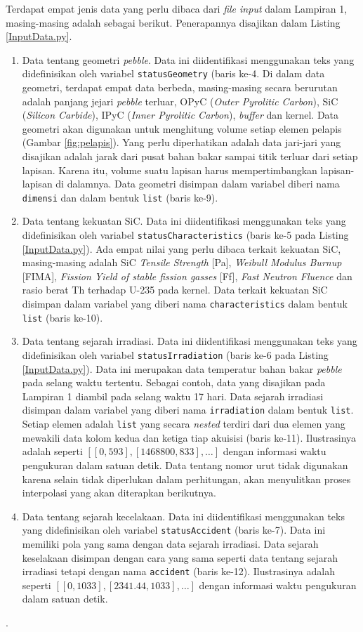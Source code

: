 \documentclass[a4paper,11pt]{report}
\begin{document}
Terdapat empat jenis data yang perlu dibaca dari \textit{file input} dalam Lampiran 1, masing-masing adalah sebagai berikut. Penerapannya disajikan dalam Listing \ref{InputData.py}.
\begin{enumerate}
  \item Data tentang geometri \textit{pebble}. Data ini diidentifikasi menggunakan teks yang didefinisikan oleh variabel \texttt{statusGeometry} (baris ke-4. Di dalam data geometri, terdapat empat data berbeda, masing-masing secara berurutan adalah panjang jejari \textit{pebble} terluar, OPyC (\textit{Outer Pyrolitic Carbon}), SiC (\textit{Silicon Carbide}), IPyC (\textit{Inner Pyrolitic Carbon}), \textit{buffer} dan kernel. Data geometri akan digunakan untuk menghitung volume setiap elemen pelapis (Gambar \ref{fig:pelapis}). Yang perlu diperhatikan adalah data jari-jari yang disajikan adalah jarak dari pusat bahan bakar sampai titik terluar dari setiap lapisan. Karena itu, volume suatu lapisan harus mempertimbangkan lapisan-lapisan di dalamnya. Data geometri disimpan dalam variabel diberi nama \texttt{dimensi} dan dalam bentuk \texttt{list} (baris ke-9).
  \item Data tentang kekuatan SiC. Data ini diidentifikasi menggunakan teks yang didefinisikan oleh variabel \texttt{statusCharacteristics} (baris ke-5 pada Listing \ref{InputData.py}). Ada empat nilai yang perlu dibaca terkait kekuatan SiC, masing-masing adalah SiC \textit{Tensile Strength} [Pa],	\textit{Weibull Modulus	Burnup} [FIMA],	\textit{Fission Yield of stable fission gasses} [Ff],	\textit{Fast Neutron Fluence}	dan rasio berat Th terhadap U-235 pada kernel. Data terkait kekuatan SiC disimpan dalam variabel yang diberi nama \texttt{characteristics} dalam bentuk \texttt{list} (baris ke-10).
    \item Data tentang sejarah irradiasi. Data ini diidentifikasi menggunakan teks yang didefinisikan oleh variabel \texttt{statusIrradiation} (baris ke-6 pada Listing \ref{InputData.py}). Data ini merupakan data temperatur bahan bakar \textit{pebble} pada selang waktu tertentu. Sebagai contoh, data yang disajikan pada Lampiran 1 diambil pada selang waktu 17 hari. Data sejarah irradiasi disimpan dalam variabel yang diberi nama \texttt{irradiation} dalam bentuk \texttt{list}. Setiap elemen adalah \texttt{list} yang secara \textit{nested} terdiri dari dua elemen yang mewakili data kolom kedua dan ketiga tiap akuisisi (baris ke-11). Ilustrasinya adalah seperti $[[0,	593], [1468800,	833], \ldots]$ dengan informasi waktu pengukuran dalam satuan detik. Data tentang nomor urut tidak digunakan karena selain tidak diperlukan dalam perhitungan, akan menyulitkan proses interpolasi yang akan diterapkan berikutnya.
    \item Data tentang sejarah kecelakaan. Data ini diidentifikasi menggunakan teks yang didefinisikan oleh variabel \texttt{statusAccident} (baris ke-7). Data ini memiliki pola yang sama dengan data sejarah irradiasi. Data sejarah keselakaan disimpan dengan cara yang sama seperti data tentang sejarah irradiasi tetapi dengan nama \texttt{accident} (baris ke-12). Ilustrasinya adalah seperti $[[0,	1033], [2341.44,	1033],\ldots]$ dengan informasi waktu pengukuran dalam satuan detik.
\end{enumerate}.
\end{document}
